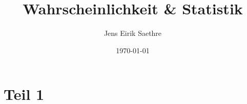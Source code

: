 \documentclass[11pt]{article}
\begin{document}
\author{Jens Eirik Saethre}
\title{Wahrscheinlichkeit \& Statistik}

\date{\today}

\setcounter{tocdepth}{2}

\setcounter{page}{1}


\part{Teil 1}



\end{document}
